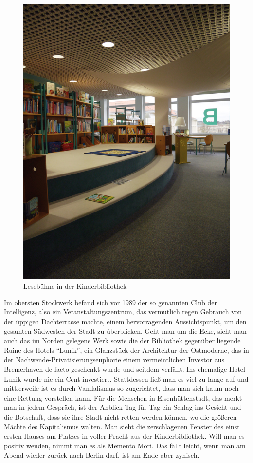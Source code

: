 \documentclass[a4paper,
fontsize=11pt,
oneside,
numbers=noperiodatend,
parskip=half-,
bibliography=totoc,
final
]{scrartcl}
\begin{document}
\begin{figure}
\centering
\includegraphics{img/image_2.jpg}
\caption{Lesebühne in der Kinderbibliothek}
\end{figure}

Im obersten Stockwerk befand sich vor 1989 der so genannten Club der
Intelligenz, also ein Veranstaltungszentrum, das vermutlich regen
Gebrauch von der üppigen Dachterrasse machte, einem hervorragenden
Aussichtspunkt, um den gesamten Südwesten der Stadt zu überblicken. Geht
man um die Ecke, sieht man auch das im Norden gelegene Werk sowie die
der Bibliothek gegenüber liegende Ruine des Hotels \enquote{Lunik}, ein
Glanzstück der Architektur der Ostmoderne, das in der
Nachwende-Privatisierungseuphorie einem vermeintlichen Investor aus
Bremerhaven de facto geschenkt wurde und seitdem verfällt. Ins ehemalige
Hotel Lunik wurde nie ein Cent investiert. Stattdessen ließ man es viel
zu lange auf und mittlerweile ist es durch Vandalismus so zugerichtet,
dass man sich kaum noch eine Rettung vorstellen kann. Für die Menschen
in Eisenhüttenstadt, das merkt man in jedem Gespräch, ist der Anblick
Tag für Tag ein Schlag ins Gesicht und die Botschaft, dass sie ihre
Stadt nicht retten werden können, wo die größeren Mächte des
Kapitalismus walten. Man sieht die zerschlagenen Fenster des einst
ersten Hauses am Platzes in voller Pracht aus der Kinderbibliothek. Will
man es positiv wenden, nimmt man es als Memento Mori. Das fällt leicht,
wenn man am Abend wieder zurück nach Berlin darf, ist am Ende aber
zynisch.
\end{document}
